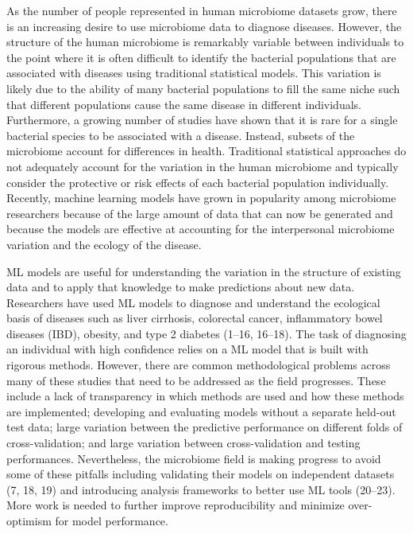 \documentclass[11pt,]{article}
\begin{document}
As the number of people represented in human microbiome datasets grow,
there is an increasing desire to use microbiome data to diagnose
diseases. However, the structure of the human microbiome is remarkably
variable between individuals to the point where it is often difficult to
identify the bacterial populations that are associated with diseases
using traditional statistical models. This variation is likely due to
the ability of many bacterial populations to fill the same niche such
that different populations cause the same disease in different
individuals. Furthermore, a growing number of studies have shown that it
is rare for a single bacterial species to be associated with a disease.
Instead, subsets of the microbiome account for differences in health.
Traditional statistical approaches do not adequately account for the
variation in the human microbiome and typically consider the protective
or risk effects of each bacterial population individually. Recently,
machine learning models have grown in popularity among microbiome
researchers because of the large amount of data that can now be
generated and because the models are effective at accounting for the
interpersonal microbiome variation and the ecology of the disease.

ML models are useful for understanding the variation in the structure of
existing data and to apply that knowledge to make predictions about new
data. Researchers have used ML models to diagnose and understand the
ecological basis of diseases such as liver cirrhosis, colorectal cancer,
inflammatory bowel diseases (IBD), obesity, and type 2 diabetes (1--16,
16--18). The task of diagnosing an individual with high confidence
relies on a ML model that is built with rigorous methods. However, there
are common methodological problems across many of these studies that
need to be addressed as the field progresses. These include a lack of
transparency in which methods are used and how these methods are
implemented; developing and evaluating models without a separate
held-out test data; large variation between the predictive performance
on different folds of cross-validation; and large variation between
cross-validation and testing performances. Nevertheless, the microbiome
field is making progress to avoid some of these pitfalls including
validating their models on independent datasets (7, 18, 19) and
introducing analysis frameworks to better use ML tools (20--23). More
work is needed to further improve reproducibility and minimize
over-optimism for model performance.
\end{document}
